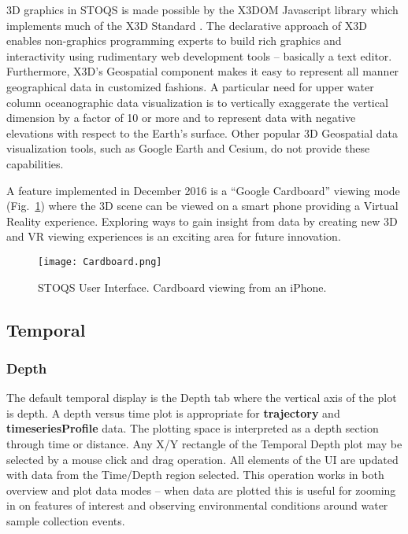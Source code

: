 \documentclass[conference]{IEEEtran}
\begin{document}
3D graphics in STOQS is made possible by the X3DOM Javascript library \cite{Behr:2010:SAH:1836049.1836077} 
which implements much of the X3D Standard \cite{x3d07}. The declarative approach of X3D
enables non-graphics programming experts to build rich graphics and interactivity 
using rudimentary web development tools -- basically a text editor. Furthermore, X3D's Geospatial component
\cite{Plesch:2015:XGC:2775292.2775315}
makes it easy to represent all manner geographical data in customized fashions. 
A particular need for upper water column oceanographic data visualization is to
vertically exaggerate the vertical dimension by a factor of 10 or more and to
represent data with negative elevations with respect to the Earth's surface.
Other popular 3D Geospatial data visualization tools, such as Google Earth 
and Cesium, do not provide these capabilities.

A feature implemented in December 2016 is a ``Google Cardboard'' viewing mode
(Fig.~\ref{fig:Cardboard}) where the 3D scene can be viewed on a smart phone providing a Virtual 
Reality experience. Exploring ways to gain insight from data by creating new
3D and VR viewing experiences is an exciting area for future innovation.

\begin{figure}[htbp]
\centering
\texttt{[image: Cardboard.png]}
\caption{STOQS User Interface. Cardboard viewing from an iPhone.}
\label{fig:Cardboard}
\end{figure}

\subsection{Temporal}

\subsubsection{Depth}
The default temporal display is the Depth tab where the vertical axis of the plot 
is depth. A depth versus time plot is appropriate for \textbf{trajectory} and 
\textbf{timeseriesProfile} data. The plotting space is interpreted as a 
depth section through time or distance. Any X/Y rectangle of the Temporal 
Depth plot may be selected by a mouse click and drag operation. 
All elements of the UI are updated with data from the Time/Depth region 
selected. This operation works in both overview and plot data 
modes -- when data are plotted this is useful for zooming in on features 
of interest and observing environmental conditions around water sample 
collection events.
\end{document}
